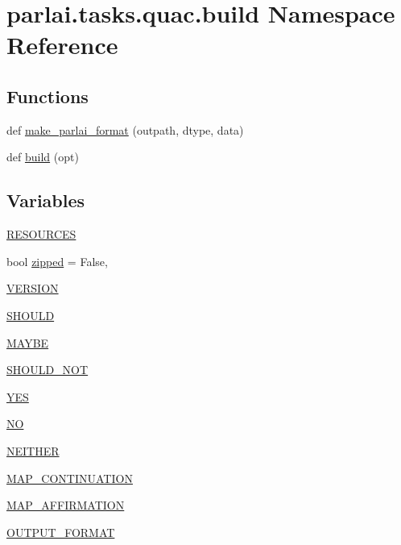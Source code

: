 \hypertarget{namespaceparlai_1_1tasks_1_1quac_1_1build}{}\section{parlai.\+tasks.\+quac.\+build Namespace Reference}
\label{namespaceparlai_1_1tasks_1_1quac_1_1build}
\subsection*{Functions}
\begin{DoxyCompactItemize}
\item 
def \hyperlink{namespaceparlai_1_1tasks_1_1quac_1_1build_a08c212462b5c58cde91192d35f24f0cc}{make\+\_\+parlai\+\_\+format} (outpath, dtype, data)
\item 
def \hyperlink{namespaceparlai_1_1tasks_1_1quac_1_1build_a86e9b7d4a167a4dc22e925770ce42824}{build} (opt)
\end{DoxyCompactItemize}
\subsection*{Variables}
\begin{DoxyCompactItemize}
\item 
\hyperlink{namespaceparlai_1_1tasks_1_1quac_1_1build_aa032453fdec498146aade28be1af2c6e}{R\+E\+S\+O\+U\+R\+C\+ES}
\item 
bool \hyperlink{namespaceparlai_1_1tasks_1_1quac_1_1build_a67e62c76845e18ca6d67211eeac4375f}{zipped} = False,
\item 
\hyperlink{namespaceparlai_1_1tasks_1_1quac_1_1build_aee2d9534e5051b42e514f35e83aa6750}{V\+E\+R\+S\+I\+ON}
\item 
\hyperlink{namespaceparlai_1_1tasks_1_1quac_1_1build_a4aacd61cba5c1f53ff8fcf6e13d83ec7}{S\+H\+O\+U\+LD}
\item 
\hyperlink{namespaceparlai_1_1tasks_1_1quac_1_1build_a65376ab86ca845a24c1c3aca39ffdf24}{M\+A\+Y\+BE}
\item 
\hyperlink{namespaceparlai_1_1tasks_1_1quac_1_1build_a0ebac26df68c69fd9163e1a61fa630ec}{S\+H\+O\+U\+L\+D\+\_\+\+N\+OT}
\item 
\hyperlink{namespaceparlai_1_1tasks_1_1quac_1_1build_a8187aab9baf4a32e341c7aac0f76ce14}{Y\+ES}
\item 
\hyperlink{namespaceparlai_1_1tasks_1_1quac_1_1build_a1f0a45f80454852cab90617333c286d1}{NO}
\item 
\hyperlink{namespaceparlai_1_1tasks_1_1quac_1_1build_a6f64e5967d769a9d8ad61771cfbd18a5}{N\+E\+I\+T\+H\+ER}
\item 
\hyperlink{namespaceparlai_1_1tasks_1_1quac_1_1build_ab5c463960c37a8cb5c2057aa7d15e537}{M\+A\+P\+\_\+\+C\+O\+N\+T\+I\+N\+U\+A\+T\+I\+ON}
\item 
\hyperlink{namespaceparlai_1_1tasks_1_1quac_1_1build_a65c0c865dad4567a45699d1069d1a923}{M\+A\+P\+\_\+\+A\+F\+F\+I\+R\+M\+A\+T\+I\+ON}
\item 
\hyperlink{namespaceparlai_1_1tasks_1_1quac_1_1build_a8f7034ce563ffc549210c71e6b26447a}{O\+U\+T\+P\+U\+T\+\_\+\+F\+O\+R\+M\+AT}
\end{DoxyCompactItemize}


